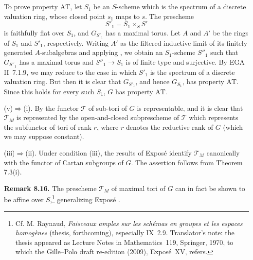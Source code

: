 To prove property \(\mathrm{AT}\), let \(S_1\) be an \(S\)-scheme
which is the spectrum of a discrete valuation ring, whose closed
point \(s_1\) maps to \(s\). The prescheme
\[
  S'_1=S_1\times_S S'
\]
is faithfully flat over \(S_1\), and \(G_{S'_1}\) has a maximal
torus. Let \(A\) and \(A'\) be the rings of \(S_1\) and \(S'_1\),
respectively. Writing \(A'\) as the filtered inductive limit of its
finitely generated \(A\)-subalgebras and applying ,
we obtain an \(S_1\)-scheme \(S''_1\) such that
\(G_{S''_1}\) has a maximal torus and
\(S''_1\to S_1\) is of finite type and surjective. By
EGA II~7.1.9, we may reduce to the case in which \(S'_1\) is the
spectrum of a discrete valuation ring. But then it is clear that \(G_{S'_1}\), and
hence \(G_{S_1}\), has property \(\mathrm{AT}\). Since this holds
for every such \(S_1\), \(G\) has property \(\mathrm{AT}\).

\textup{(v)}\(\Rightarrow\)\textup{(i)}.
By  the functor \(\mathcal T\) of sub-tori of \(G\) is
representable, and it is clear that \(\mathcal T_M\) is represented by
the open-and-closed subprescheme of \(\mathcal T\) which represents the
subfunctor of tori of rank \(r\), where \(r\) denotes the reductive rank of
\(G\) (which we may suppose constant).

\textup{(iii)}\(\Rightarrow\)\textup{(ii)}.
Under condition \textup{(iii)}, the results of Exposé 
identify \(\mathcal T_M\) canonically with the functor of Cartan
subgroups of \(G\). The assertion follows from Theorem 7.3(i).

\medskip\noindent\textbf{Remark 8.16.}
The prescheme \(\mathcal T_M\) of maximal tori of \(G\) can in fact
be shown to be affine over \(S\),\footnote{Cf. M. Raynaud,
\emph{Faisceaux amples sur les schémas en groupes et les espaces
homogènes} (thesis, forthcoming), especially IX~2.9. Translator's note: the thesis
appeared as Lecture Notes in Mathematics~119, Springer, 1970, to which the
Gille--Polo draft re-edition (2009), Exposé~XV, refers.} generalizing Exposé .


